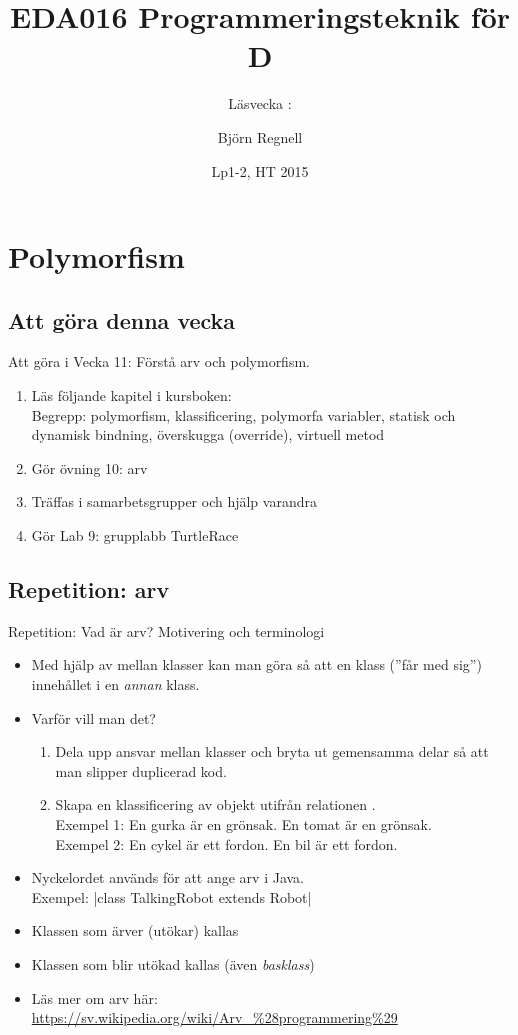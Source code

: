 \documentclass{lecturenotes}
\title[Föreläsningsanteckningar EDA016, 2015]{EDA016 Programmeringsteknik för D}
\subtitle{Läsvecka \vecka: \tema}
\author{Björn Regnell}
\institute{Datavetenskap, LTH}
\date{Lp1-2, HT 2015}
\renewcommand{\vecka}{11}
\newcommand{\tema}{Polymorfism}
\begin{document}
\frame{\titlepage}
\setnextsection{\vecka}
\section[Vecka \vecka: \tema]{\tema}
\frame{\tableofcontents}

\subsection{Att göra denna vecka}
\begin{Slide}{Att göra i Vecka \vecka: Förstå arv och polymorfism.}
\begin{enumerate}
\item Läs följande kapitel i kursboken:   \\  
Begrepp: polymorfism, klassificering, polymorfa variabler, statisk och dynamisk bindning, överskugga (override), virtuell metod
\item Gör övning 10: arv
\item Träffas i samarbetsgrupper och hjälp varandra 
\item Gör Lab 9: grupplabb TurtleRace
\end{enumerate}
\end{Slide}


\subsection{Repetition: arv}
\begin{Slide}{Repetition: Vad är arv? Motivering och terminologi}\footnotesize
\begin{itemize}
\item Med hjälp av  mellan klasser kan man göra så att en klass  (''får med sig'') innehållet i en \textit{annan} klass.
\item Varför vill man det? 
\begin{enumerate}\footnotesize
\item Dela upp ansvar mellan klasser och bryta ut gemensamma delar så att man slipper duplicerad kod.
\item Skapa en klassificering av objekt utifrån relationen  .  \\ Exempel 1: En gurka är en grönsak. En tomat är en grönsak. \\ Exempel 2: En cykel är ett fordon. En bil är ett fordon. 
\end{enumerate}
\item Nyckelordet  används för att ange arv i Java. \\ Exempel:   \code|class TalkingRobot extends Robot|
\item Klassen som ärver (utökar) kallas 
\item Klassen som blir utökad kallas  (även \textit{basklass})
\item Läs mer om arv  här: \scriptsize \url{https://sv.wikipedia.org/wiki/Arv\_\%28programmering\%29} 
\end{itemize}
\end{Slide}
\end{document}
